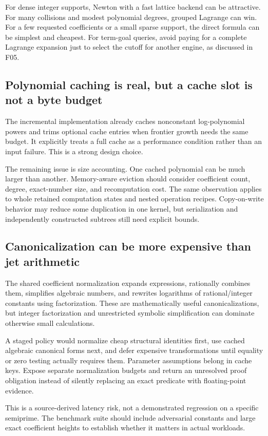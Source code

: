 \documentclass[11pt,a4paper]{article}
\begin{document}
For dense integer supports, Newton with a fast lattice backend can be attractive. For many collisions and modest polynomial degrees, grouped Lagrange can win. For a few requested coefficients or a small sparse support, the direct formula can be simplest and cheapest. For term-goal queries, avoid paying for a complete Lagrange expansion just to select the cutoff for another engine, as discussed in F05.

\subsection{Polynomial caching is real, but a cache slot is not a byte budget}
The incremental implementation already caches nonconstant log-polynomial powers and trims optional cache entries when frontier growth needs the same budget. It explicitly treats a full cache as a performance condition rather than an input failure. This is a strong design choice.\cite{incremental}

The remaining issue is size accounting. One cached polynomial can be much larger than another. Memory-aware eviction should consider coefficient count, degree, exact-number size, and recomputation cost. The same observation applies to whole retained computation states and nested operation recipes. Copy-on-write behavior may reduce some duplication in one kernel, but serialization and independently constructed subtrees still need explicit bounds.

\subsection{Canonicalization can be more expensive than jet arithmetic}
The shared coefficient normalization expands expressions, rationally combines them, simplifies algebraic numbers, and rewrites logarithms of rational/integer constants using factorization. These are mathematically useful canonicalizations, but integer factorization and unrestricted symbolic simplification can dominate otherwise small calculations.\cite{main}

A staged policy would normalize cheap structural identities first, use cached algebraic canonical forms next, and defer expensive transformations until equality or zero testing actually requires them. Parameter assumptions belong in cache keys. Expose separate normalization budgets and return an unresolved proof obligation instead of silently replacing an exact predicate with floating-point evidence.

This is a source-derived latency risk, not a demonstrated regression on a specific semiprime. The benchmark suite should include adversarial constants and large exact coefficient heights to establish whether it matters in actual workloads.
\end{document}
